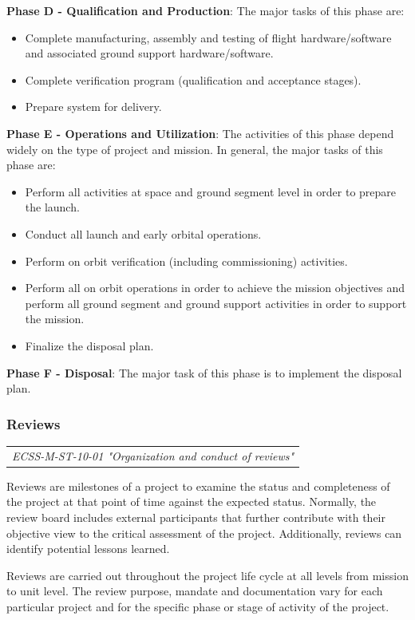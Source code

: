 \textbf{Phase D - Qualification and Production}: The major tasks of this phase are:
\begin{itemize}
\item Complete manufacturing, assembly and testing of flight hardware/software and associated ground support hardware/software.
\item Complete verification program (qualification and acceptance stages).
\item Prepare system for delivery.
\end{itemize}

\textbf{Phase E - Operations and Utilization}: The activities of this phase depend widely on the type of project and mission. In general, the major tasks of this phase are:
\begin{itemize}
\item Perform all activities at space and ground segment level in order to prepare the launch.
\item Conduct all launch and early orbital operations.
\item Perform on orbit verification (including commissioning) activities.
\item Perform all on orbit operations in order to achieve the mission objectives and perform all ground segment and ground support activities in order to support the mission.
\item Finalize the disposal plan.
\end{itemize}

\textbf{Phase F - Disposal}: The major task of this phase is to implement the disposal plan.

\subsubsection{Reviews}

\begin{tabular}{l}
\textit{ECSS-M-ST-10-01 "Organization and conduct of reviews" \cite{ECSS-M-ST-10-01}} 
\end{tabular}

Reviews are milestones of a project to examine the status and completeness of the project at that point of time against the expected status. Normally, the review board includes external participants that further contribute with their objective view to the critical assessment of the project. Additionally, reviews can identify potential lessons learned.

Reviews are carried out throughout the project life cycle at all levels from mission to unit level. The review purpose, mandate and documentation vary for each particular project and for the specific phase or stage of activity of the project. 

